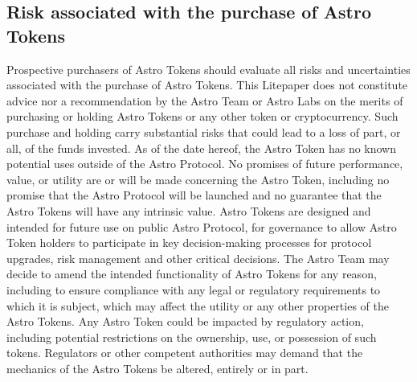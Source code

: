 \subsection{Risk associated with the purchase of Astro Tokens}
Prospective purchasers of Astro Tokens should evaluate all risks and uncertainties associated with the purchase of Astro Tokens. This Litepaper does not constitute advice nor a recommendation by the Astro Team or Astro Labs on the merits of purchasing or holding Astro Tokens or any other token or cryptocurrency. Such purchase and holding carry substantial risks that could lead to a loss of part, or all, of the funds invested. As of the date hereof, the Astro Token has no known potential uses outside of the Astro Protocol. No promises of future performance, value, or utility are or will be made concerning the Astro Token, including no promise that the Astro Protocol will be launched and no guarantee that the Astro Tokens will have any intrinsic value. Astro Tokens are designed and intended for future use on public Astro Protocol, for governance to allow Astro Token holders to participate in key decision-making processes for protocol upgrades, risk management and other critical decisions. The Astro Team may decide to amend the intended functionality of Astro Tokens for any reason, including to ensure compliance with any legal or regulatory requirements to which it is subject, which may affect the utility or any other properties of the Astro Tokens. Any Astro Token could be impacted by regulatory action, including potential restrictions on the ownership, use, or possession of such tokens. Regulators or other competent authorities may demand that the mechanics of the Astro Tokens be altered, entirely or in part.